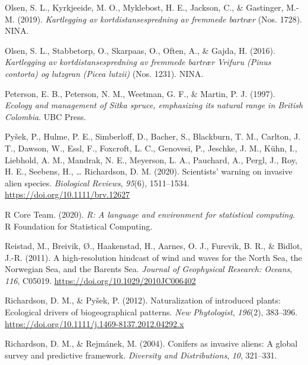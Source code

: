 \documentclass[
]{article}
\begin{document}
\leavevmode\hypertarget{ref-olsenKartleggingAvKortdistansespredning2019}{}%
Olsen, S. L., Kyrkjeeide, M. O., Myklebost, H. E., Jackson, C., \& Gastinger, M.-M. (2019). \emph{Kartlegging av kortdistansespredning av fremmede bartrær} (Nos. 1728). NINA.

\leavevmode\hypertarget{ref-olsenKartleggingAvKortdistansespredning2016}{}%
Olsen, S. L., Stabbetorp, O., Skarpaas, O., Often, A., \& Gajda, H. (2016). \emph{Kartlegging av kortdistansespredning av fremmede bartrær Vrifuru (Pinus contorta) og lutzgran (Picea lutzii)} (Nos. 1231). NINA.

\leavevmode\hypertarget{ref-petersonEcologyManagementSitka1997}{}%
Peterson, E. B., Peterson, N. M., Weetman, G. F., \& Martin, P. J. (1997). \emph{Ecology and management of Sitka spruce, emphasizing its natural range in British Colombia}. UBC Press.

\leavevmode\hypertarget{ref-pysekScientistsWarningInvasive2020}{}%
Pyšek, P., Hulme, P. E., Simberloff, D., Bacher, S., Blackburn, T. M., Carlton, J. T., Dawson, W., Essl, F., Foxcroft, L. C., Genovesi, P., Jeschke, J. M., Kühn, I., Liebhold, A. M., Mandrak, N. E., Meyerson, L. A., Pauchard, A., Pergl, J., Roy, H. E., Seebens, H., \ldots{} Richardson, D. M. (2020). Scientists' warning on invasive alien species. \emph{Biological Reviews}, \emph{95}(6), 1511--1534. \url{https://doi.org/10.1111/brv.12627}

\leavevmode\hypertarget{ref-rcoreteamLanguageEnvironmentStatistical2020}{}%
R Core Team. (2020). \emph{R: A language and environment for statistical computing}. R Foundation for Statistical Computing.

\leavevmode\hypertarget{ref-reistadHighresolutionHindcastWind2011}{}%
Reistad, M., Breivik, Ø., Haakenstad, H., Aarnes, O. J., Furevik, B. R., \& Bidlot, J.-R. (2011). A high-resolution hindcast of wind and waves for the North Sea, the Norwegian Sea, and the Barents Sea. \emph{Journal of Geophysical Research: Oceans}, \emph{116}, C05019. \url{https://doi.org/10.1029/2010JC006402}

\leavevmode\hypertarget{ref-richardsonNaturalizationIntroducedPlants2012}{}%
Richardson, D. M., \& Pyšek, P. (2012). Naturalization of introduced plants: Ecological drivers of biogeographical patterns. \emph{New Phytologist}, \emph{196}(2), 383--396. \url{https://doi.org/10.1111/j.1469-8137.2012.04292.x}

\leavevmode\hypertarget{ref-richardsonConifersInvasiveAliens2004}{}%
Richardson, D. M., \& Rejmánek, M. (2004). Conifers as invasive aliens: A global survey and predictive framework. \emph{Diversity and Distributions}, \emph{10}, 321--331.
\end{document}
